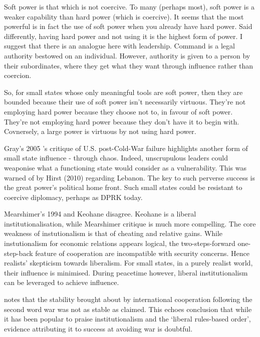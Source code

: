 Soft power is that which is not coercive. To many (perhaps most), soft power is a weaker capability than hard power (which is coercive). It seems that the most powerful is in fact the use of soft power when you already have hard power. Said differently, having hard power and not using it is the highest form of power. I suggest that there is an analogue here with leadership. Command is a legal authority bestowed on an individual. However, authority is given to a person by their subordinates, where they get what they want through influence rather than coercion. 

So, for small states whose only meaningful tools are soft power, then they are bounded because their use of soft power isn't necessarily virtuous. They're not employing hard power because they choose not to, in favour of soft power. They're not employing hard power because they don't have it to begin with. Covnersely, a large power is virtuous by not using hard power.


Gray's 2005 \nocite{GRAY_2005}'s critique of U.S. post-Cold-War failure highlights another form of small state influence - through chaos. Indeed, unscrupulous leaders could weaponise what a functioning state would consider as a vulnerability. This was warned of by Hirst (2010) \nocite{HIRST_2010} regarding Lebanon. The key to such perverse success is the great power's political home front. Such small states could be resistant to coercive diplomacy, perhaps as DPRK today.

Mearshimer's 1994 \nocite{MEARSHIMER_1994} and Keohane \nocite{KEOHANE_1969} disagree. Keohane is a liberal institutionalisation, while Mearshimer critique is much more compelling. The core weakness of instutionalism is that of cheating and relative gains. While instutionalism for economic relations appears logical, the two-steps-forward one-step-back feature of cooperation are incompatible with security concerns. Hence realists' skepticism towards liberalism. For small states, in a purely realist world, their influence is minimised. During peacetime however, liberal institutionalism can be leveraged to achieve influence. 


\textcite{HINTON_2020} notes that the stability brought about by international cooperation following the second word war was not as stable as claimed. This echoes \textcite{MEARSHEIMER_1994} conclusion that while it has been popular to praise institutionalism and the `liberal rules-based order', evidence attributing it to success at avoiding war is doubtful.

